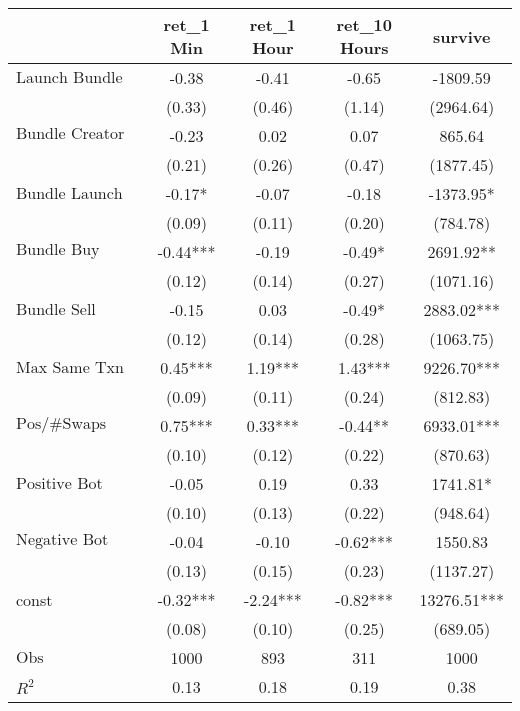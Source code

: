 \begin{tabular}{lcccc}
\hline
 & ret_1 Min & ret_1 Hour & ret_10 Hours & survive \\
\hline
$\text{Launch Bundle}$ & -0.38 & -0.41 & -0.65 & -1809.59 \\
 & (0.33) & (0.46) & (1.14) & (2964.64) \\
$\text{Bundle Creator Buy}$ & -0.23 & 0.02 & 0.07 & 865.64 \\
 & (0.21) & (0.26) & (0.47) & (1877.45) \\
$\text{Bundle Launch}$ & -0.17* & -0.07 & -0.18 & -1373.95* \\
 & (0.09) & (0.11) & (0.20) & (784.78) \\
$\text{Bundle Buy}$ & -0.44*** & -0.19 & -0.49* & 2691.92** \\
 & (0.12) & (0.14) & (0.27) & (1071.16) \\
$\text{Bundle Sell}$ & -0.15 & 0.03 & -0.49* & 2883.02*** \\
 & (0.12) & (0.14) & (0.28) & (1063.75) \\
$\text{Max Same Txn}$ & 0.45*** & 1.19*** & 1.43*** & 9226.70*** \\
 & (0.09) & (0.11) & (0.24) & (812.83) \\
$\text{Pos/\#Swaps}$ & 0.75*** & 0.33*** & -0.44** & 6933.01*** \\
 & (0.10) & (0.12) & (0.22) & (870.63) \\
$\text{Positive Bot Comment}$ & -0.05 & 0.19 & 0.33 & 1741.81* \\
 & (0.10) & (0.13) & (0.22) & (948.64) \\
$\text{Negative Bot Comment}$ & -0.04 & -0.10 & -0.62*** & 1550.83 \\
 & (0.13) & (0.15) & (0.23) & (1137.27) \\
const & -0.32*** & -2.24*** & -0.82*** & 13276.51*** \\
 & (0.08) & (0.10) & (0.25) & (689.05) \\
$\text{Obs}$ & 1000 & 893 & 311 & 1000 \\
$R^2$ & 0.13 & 0.18 & 0.19 & 0.38 \\
\hline
\end{tabular}